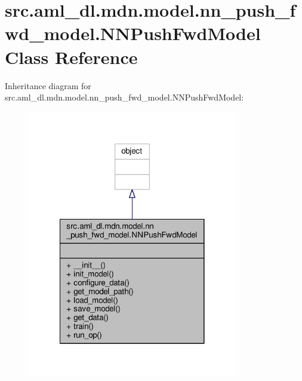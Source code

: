 \hypertarget{classsrc_1_1aml__dl_1_1mdn_1_1model_1_1nn__push__fwd__model_1_1_n_n_push_fwd_model}{\section{src.\-aml\-\_\-dl.\-mdn.\-model.\-nn\-\_\-push\-\_\-fwd\-\_\-model.\-N\-N\-Push\-Fwd\-Model Class Reference}
\label{classsrc_1_1aml__dl_1_1mdn_1_1model_1_1nn__push__fwd__model_1_1_n_n_push_fwd_model}
}


Inheritance diagram for src.\-aml\-\_\-dl.\-mdn.\-model.\-nn\-\_\-push\-\_\-fwd\-\_\-model.\-N\-N\-Push\-Fwd\-Model\-:
\nopagebreak
\begin{figure}[H]
\begin{center}
\leavevmode
\includegraphics[width=260pt]{classsrc_1_1aml__dl_1_1mdn_1_1model_1_1nn__push__fwd__model_1_1_n_n_push_fwd_model__inherit__graph}
\end{center}
\end{figure}


